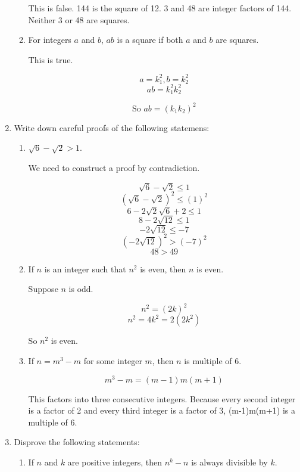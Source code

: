 \documentclass{article}
\begin{document}
\begin{enumerate}
\begin{enumerate}
				This is false. 144 is the square of 12. 3 and 48 are integer factors of 144. Neither 3 or 48 are squares.
				
			\item For integers $a$ and $b$, $ab$ is a square if both $a$ and $b$ are squares.
			
				This is true.
				
				$$a = k_{1}^2, b = k_{2}^{2}$$
				$$ab =  k_{1}^{2} k_{2}^{2}$$
				
				$$\text{So } ab = (k_1 k_2)^2$$
				
			
		\end{enumerate}	
		
		\item Write down careful proofs of the following statemens:
		
		\begin{enumerate}
		
			\item $\sqrt{6} - \sqrt{2} > 1$.
			
			We need to construct a proof by contradiction.
			
			$$\sqrt{6} - \sqrt{2} \leq 1$$
			$$(\sqrt{6} - \sqrt{2})^2 \leq (1)^2$$
			$$6 - 2\sqrt{2}\sqrt{6} + 2 \leq 1$$
			$$8 - 2\sqrt{12} \leq 1$$
			$$-2\sqrt{12} \leq -7$$
			$$(-2\sqrt{12})^2 > (-7)^2$$
			$$48 > 49$$
			
			\item If $n$ is an integer such that $n^2$ is even, then $n$ is even.
			
			Suppose $n$ is odd.
			
			$$n^2 = (2k)^2$$
			$$n^2 = 4k^2 = 2(2k^2)$$
			
			So $n^2$ is even.
			
			\item If $n = m^3 - m$ for some integer $m$, then $n$ is multiple of 6.
			
				$$m^3 - m = (m-1)m(m+1)$$
				
				This factors into three consecutive integers. Because every second integer is 
				a factor of 2 and every third integer is a factor of 3, (m-1)m(m+1) is a multiple of 6.
				
				
		\end{enumerate}
		
		\item Disprove the following statements:
		
		\begin{enumerate}
		
			\item If $n$ and $k$ are positive integers, then $n^k - n$ is always divisible by $k$.
			

\end{enumerate}
\end{enumerate}
\end{document}
